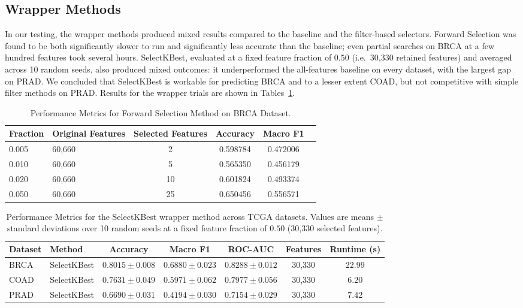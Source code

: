 \documentclass{article}
\begin{document}
\subsection{Wrapper Methods}

In our testing, the wrapper methods produced mixed results compared to the baseline and the filter-based selectors. Forward Selection was found to be both significantly slower to run and significantly less accurate than the baseline; even partial searches on BRCA at a few hundred features took several hours. SelectKBest, evaluated at a fixed feature fraction of $0.50$ (i.e.\ 30{,}330 retained features) and averaged across 10 random seeds, also produced mixed outcomes: it underperformed the all-features baseline on every dataset, with the largest gap on PRAD. We concluded that SelectKBest is workable for predicting BRCA and to a lesser extent COAD, but not competitive with simple filter methods on PRAD. Results for the wrapper trials are shown in Tables~\ref{tab:forward_metrics}.

\begin{table}[htbp]
\centering
\caption{Performance Metrics for Forward Selection Method on BRCA Dataset.}
\label{tab:forward_metrics}
\begin{tabular}{@{}llcccc@{}}
\toprule
\textbf{Fraction} & \textbf{Original Features} & \textbf{Selected Features} & \textbf{Accuracy} & \textbf{Macro F1}  \\ \midrule
0.005 & 60,660            & 2            & 0.598784           & 0.472006             \\ \midrule
0.010 & 60,660            & 5            & 0.565350           & 0.456179             \\ \midrule
0.020 & 60,660            & 10           & 0.601824           & 0.493374             \\ \midrule
0.050 & 60,660            & 25           & 0.650456           & 0.556571             \\ 
\bottomrule
\end{tabular}
\end{table}

\begin{table}[htbp]
\centering
\caption{Performance Metrics for the SelectKBest wrapper method across TCGA datasets. Values are means $\pm$ standard deviations over 10 random seeds at a fixed feature fraction of $0.50$ (30{,}330 selected features).}
\label{tab:skb_metrics}
\begin{tabular}{@{}llccccc@{}}
\toprule
\textbf{Dataset} & \textbf{Method} & \textbf{Accuracy} & \textbf{Macro F1} & \textbf{ROC-AUC} & \textbf{Features} & \textbf{Runtime (s)} \\ \midrule
BRCA & SelectKBest  & $0.8015 \pm 0.008$ & $0.6880 \pm 0.023$ & $0.8288 \pm 0.012$ & 30,330 & 22.99 \\ \midrule
COAD & SelectKBest  & $0.7631 \pm 0.049$ & $0.5971 \pm 0.062$ & $0.7977 \pm 0.056$ & 30,330 & 6.20 \\ \midrule
PRAD & SelectKBest  & $0.6690 \pm 0.031$ & $0.4194 \pm 0.030$ & $0.7154 \pm 0.029$ & 30,330 & 7.42 \\
\bottomrule
\end{tabular}
\end{table}
\end{document}

